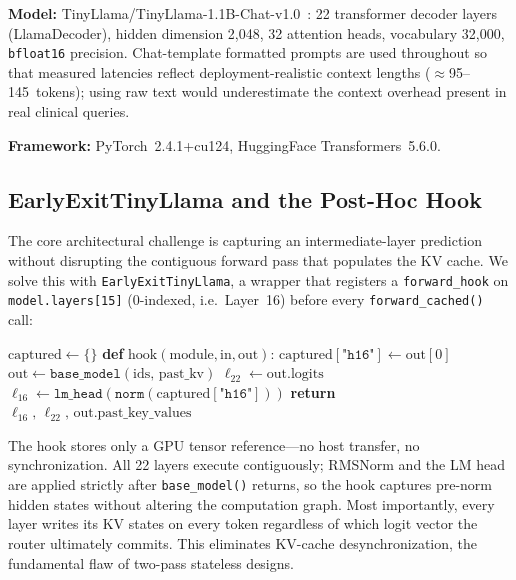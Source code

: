 \documentclass[conference]{IEEEtran}
\begin{document}
\smallskip\noindent\textbf{Model:}
TinyLlama\slash{}TinyLlama-1.1B-Chat-v1.0~\cite{zhang2024tinyllama}: 22
transformer decoder layers (LlamaDecoder), hidden dimension 2{,}048,
32 attention heads, vocabulary 32{,}000, \texttt{bfloat16} precision.
Chat-template formatted prompts are used throughout so that measured
latencies reflect deployment-realistic context lengths
($\approx$95--145~tokens); using raw text would underestimate the context
overhead present in real clinical queries.

\smallskip\noindent\textbf{Framework:}
PyTorch~2.4.1+cu124, HuggingFace Transformers~5.6.0.

\subsection{EarlyExitTinyLlama and the Post-Hoc Hook}

The core architectural challenge is capturing an intermediate-layer
prediction without disrupting the contiguous forward pass that populates
the KV cache.
We solve this with \texttt{EarlyExitTinyLlama}, a wrapper that registers a
\texttt{forward\_hook} on \texttt{model.layers[15]} (0-indexed, i.e.\
Layer~16) before every \texttt{forward\_cached()} call:

\begin{algorithmic}[1]
\STATE $\text{captured} \leftarrow \{\}$
\STATE \textbf{def} $\text{hook}(\text{module}, \text{in}, \text{out})$:
\STATE \quad $\text{captured}[\texttt{"h16"}] \leftarrow \text{out}[0]$
       \COMMENT{GPU ref, no host copy}
\STATE $\text{out} \leftarrow \texttt{base\_model}(\text{ids},\, \text{past\_kv})$
       \COMMENT{22 layers run}
\STATE $\ell_{22} \leftarrow \text{out.logits}$
\STATE $\ell_{16} \leftarrow \texttt{lm\_head}(\texttt{norm}(\text{captured}[\texttt{"h16"}]))$
\STATE \textbf{return} $\ell_{16},\, \ell_{22},\, \text{out.past\_key\_values}$
\end{algorithmic}

The hook stores only a GPU tensor reference---no host transfer, no
synchronization.
All 22 layers execute contiguously; RMSNorm and the LM head are applied
strictly after \texttt{base\_model()} returns, so the hook captures
pre-norm hidden states without altering the computation graph.
Most importantly, every layer writes its KV states on every token
regardless of which logit vector the router ultimately commits.
This eliminates KV-cache desynchronization, the fundamental flaw of
two-pass stateless designs.
\end{document}
